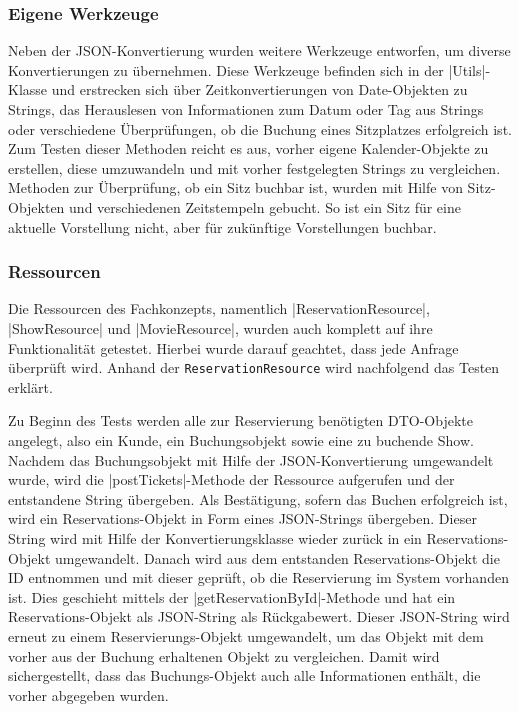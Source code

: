 \subsubsection{Eigene Werkzeuge}

Neben der \acs{JSON}-Konvertierung wurden weitere Werkzeuge entworfen, um diverse Konvertierungen zu übernehmen.
Diese Werkzeuge befinden sich in der \jinline |Utils|-Klasse und erstrecken sich über Zeitkonvertierungen von Date-Objekten zu Strings, das Herauslesen von Informationen zum Datum oder Tag aus Strings oder verschiedene Überprüfungen, ob die Buchung eines Sitzplatzes erfolgreich ist.
Zum Testen dieser Methoden reicht es aus, vorher eigene Kalender-Objekte zu erstellen, diese umzuwandeln und mit vorher festgelegten Strings zu vergleichen.
Methoden zur Überprüfung, ob ein Sitz buchbar ist, wurden mit Hilfe von Sitz-Objekten und verschiedenen Zeitstempeln gebucht.
So ist ein Sitz für eine aktuelle Vorstellung nicht, aber für zukünftige Vorstellungen buchbar.

\subsubsection{Ressourcen}
Die Ressourcen des Fachkonzepts, namentlich \jinline|ReservationResource|, \jinline|ShowResource| und \jinline|MovieResource|, wurden auch komplett auf ihre Funktionalität getestet.
Hierbei wurde darauf geachtet, dass jede Anfrage überprüft wird.
Anhand der \texttt{Reservation\-Resource} wird nachfolgend das Testen erklärt.

Zu Beginn des Tests werden alle zur Reservierung benötigten \acs{DTO}-Objekte angelegt, also ein Kunde, ein Buchungsobjekt sowie eine zu buchende Show.
Nachdem das Buchungsobjekt mit Hilfe der \acs{JSON}-Konvertierung umgewandelt wurde, wird die \jinline |postTickets|-Methode der Ressource aufgerufen und der entstandene String übergeben.
Als Bestätigung, sofern das Buchen erfolgreich ist, wird ein Reservations-Objekt in Form eines \acs{JSON}-Strings übergeben.
Dieser String wird mit Hilfe der Konvertierungsklasse wieder zurück in ein Reservations-Objekt umgewandelt.
Danach wird aus dem entstanden Reservations-Objekt die ID entnommen und mit dieser geprüft, ob die Reservierung im System vorhanden ist.
Dies geschieht mittels der \jinline |getReservationById|-Methode und hat ein Reservations-Objekt als \acs{JSON}-String als Rückgabewert.
Dieser \acs{JSON}-String wird erneut zu einem Reservierungs-Objekt umgewandelt, um das Objekt mit dem vorher aus der Buchung erhaltenen Objekt zu vergleichen.
Damit wird sichergestellt, dass das Buchungs-Objekt auch alle Informationen enthält, die vorher abgegeben wurden.

